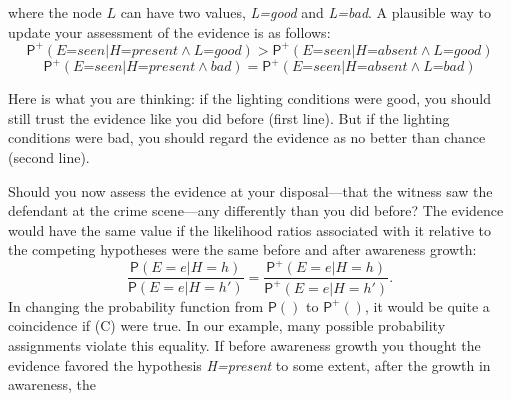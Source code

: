 \documentclass[
  11pt,
  dvipsnames,enabledeprecatedfontcommands]{scrartcl}
\newcommand{\pr}[1]{\ensuremath{\mathsf{P}(#1)}}
\newcommand{\ppr}[2]{\ensuremath{\mathsf{P}^{#1}(#2)}}
\begin{document}
\noindent where the node \(L\) can have two values, \textit{L=good} and
\textit{L=bad}. A plausible way to update your assessment of the
evidence is as follows:
\[\ppr{+}{\textit{E=seen} \vert \textit{H=present} \wedge \textit{L=good}} > \ppr{+}{\textit{E=seen} \vert \textit{H=absent} \wedge \textit{L=good}}\]
\[\ppr{+}{\textit{E=seen} \vert \textit{H=present} \wedge \textit{bad}} = \ppr{+}{\textit{E=seen} \vert \textit{H=absent} \wedge \textit{L=bad}}\]

\noindent Here is what you are thinking: if the lighting conditions were
good, you should still trust the evidence like you did before (first
line). But if the lighting conditions were bad, you should regard the
evidence as no better than chance (second line).

Should you now assess the evidence at your disposal---that the witness
saw the defendant at the crime scene---any differently than you did
before? The evidence would have the same value if the likelihood ratios
associated with it relative to the competing hypotheses were the same
before and after awareness growth:
\[\frac{\pr{E=e \vert H=h}}{\pr{E=e \vert H=h'}}= \frac{\ppr{+}{E=e \vert H=h}}{\ppr{+}{E=e \vert H=h'}} \tag{C}.\]
In changing the probability function from \(\pr{}\) to \(\ppr{+}{}\), it
would be quite a coincidence if (C) were true. In our example, many
possible probability assignments violate this equality. If before
awareness growth you thought the evidence favored the hypothesis
\textit{H=present} to some extent, after the growth in awareness, the
\end{document}
